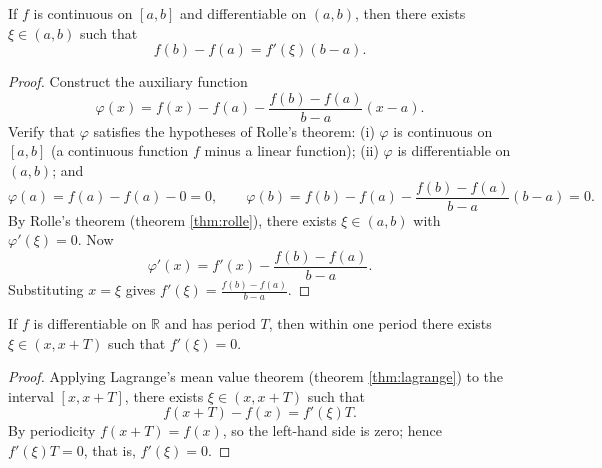 \begin{theorem}\label{thm:lagrange}
If $f$ is continuous on $[a,b]$ and differentiable on $(a,b)$, then there exists $\xi \in (a,b)$ such that
\[f(b) - f(a) = f'(\xi)(b-a).\]
\end{theorem}

\begin{proof}
Construct the auxiliary function
\[
\varphi(x) = f(x) - f(a) - \frac{f(b)-f(a)}{b-a}(x-a).
\]
Verify that $\varphi$ satisfies the hypotheses of Rolle's theorem: (i) $\varphi$ is continuous on $[a,b]$ (a continuous function $f$ minus a linear function); (ii) $\varphi$ is differentiable on $(a,b)$; and
\[
\varphi(a) = f(a) - f(a) - 0 = 0, \qquad
\varphi(b) = f(b) - f(a) - \frac{f(b)-f(a)}{b-a}(b-a) = 0.
\]
By Rolle's theorem (theorem \ref{thm:rolle}), there exists $\xi \in (a,b)$ with $\varphi'(\xi) = 0$. Now
\[
\varphi'(x) = f'(x) - \frac{f(b)-f(a)}{b-a}.
\]
Substituting $x = \xi$ gives $f'(\xi) = \frac{f(b)-f(a)}{b-a}$.
\end{proof}

\begin{corollary}\label{cor:periodic_mean_value}
If $f$ is differentiable on $\mathbb{R}$ and has period $T$, then within one period there exists $\xi \in (x, x+T)$ such that $f'(\xi) = 0$.
\end{corollary}

\begin{proof}
Applying Lagrange's mean value theorem (theorem \ref{thm:lagrange}) to the interval $[x, x+T]$, there exists $\xi \in (x, x+T)$ such that
\[
f(x+T) - f(x) = f'(\xi)T.
\]
By periodicity $f(x+T) = f(x)$, so the left-hand side is zero; hence $f'(\xi)T = 0$, that is, $f'(\xi) = 0$.
\end{proof}


